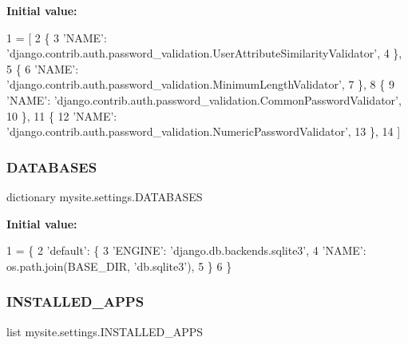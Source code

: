 {\bfseries Initial value\+:}
\begin{DoxyCode}
1 =  [
2     \{
3         \textcolor{stringliteral}{'NAME'}: \textcolor{stringliteral}{'django.contrib.auth.password\_validation.UserAttributeSimilarityValidator'},
4     \},
5     \{
6         \textcolor{stringliteral}{'NAME'}: \textcolor{stringliteral}{'django.contrib.auth.password\_validation.MinimumLengthValidator'},
7     \},
8     \{
9         \textcolor{stringliteral}{'NAME'}: \textcolor{stringliteral}{'django.contrib.auth.password\_validation.CommonPasswordValidator'},
10     \},
11     \{
12         \textcolor{stringliteral}{'NAME'}: \textcolor{stringliteral}{'django.contrib.auth.password\_validation.NumericPasswordValidator'},
13     \},
14 ]
\end{DoxyCode}
\mbox{\label{namespacemysite_1_1settings_a04300628acd12c08ea63ee5f9d3d83d1}} 
\subsubsection{\texorpdfstring{D\+A\+T\+A\+B\+A\+S\+ES}{DATABASES}}
{\footnotesize\ttfamily dictionary mysite.\+settings.\+D\+A\+T\+A\+B\+A\+S\+ES}

{\bfseries Initial value\+:}
\begin{DoxyCode}
1 =  \{
2     \textcolor{stringliteral}{'default'}: \{
3         \textcolor{stringliteral}{'ENGINE'}: \textcolor{stringliteral}{'django.db.backends.sqlite3'},
4         \textcolor{stringliteral}{'NAME'}: os.path.join(BASE\_DIR, \textcolor{stringliteral}{'db.sqlite3'}),
5     \}
6 \}
\end{DoxyCode}
\mbox{\label{namespacemysite_1_1settings_ae0300504ffe212a8082806286d6fe36b}} 
\subsubsection{\texorpdfstring{I\+N\+S\+T\+A\+L\+L\+E\+D\+\_\+\+A\+P\+PS}{INSTALLED\_APPS}}
{\footnotesize\ttfamily list mysite.\+settings.\+I\+N\+S\+T\+A\+L\+L\+E\+D\+\_\+\+A\+P\+PS}

